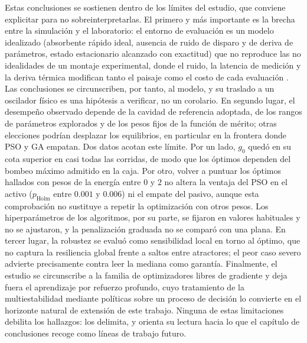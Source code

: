 Estas conclusiones se sostienen dentro de los límites del estudio, que conviene explicitar
para no sobreinterpretarlas. El primero y más importante es la brecha entre la simulación
y el laboratorio: el entorno de evaluación es un modelo idealizado (absorbente rápido
ideal, ausencia de ruido de disparo y de deriva de parámetros, estado estacionario
alcanzado con exactitud) que no reproduce las no idealidades de un montaje experimental,
donde el ruido, la latencia de medición y la deriva térmica modifican tanto el paisaje
como el costo de cada evaluación \cite{Zhao2020,Baumeister2018}. Las conclusiones se
circunscriben, por tanto, al modelo, y su traslado a un oscilador físico es una hipótesis
a verificar, no un corolario. En segundo lugar, el desempeño observado depende de la
cavidad de referencia adoptada, de los rangos de parámetros explorados y de los pesos
fijos de la función de mérito; otras elecciones podrían desplazar los equilibrios, en
particular en la frontera donde PSO y GA empatan.
Dos datos acotan este límite. Por un lado, $g_0$ quedó en su cota superior en casi todas
las corridas, de modo que los óptimos dependen del bombeo máximo admitido en la caja. Por
otro, volver a puntuar los óptimos hallados con pesos de la energía entre $0$ y $2$ no
altera la ventaja del PSO en el activo ($p_{\mathrm{Holm}}$ entre $0.001$ y $0.006$) ni el
empate del pasivo, aunque esta comprobación no sustituye a repetir la optimización con
otros pesos. Los hiperparámetros de los algoritmos, por su parte, se fijaron en valores
habituales y no se ajustaron, y la penalización graduada no se comparó con una plana. En tercer lugar, la robustez se evaluó
como sensibilidad local en torno al óptimo, que no captura la resiliencia global frente a
saltos entre atractores; el peor caso severo advierte precisamente contra leer la mediana
como garantía. Finalmente, el estudio se circunscribe a la familia de optimizadores libres
de gradiente y deja fuera el aprendizaje por refuerzo profundo, cuyo tratamiento de la
multiestabilidad mediante políticas sobre un proceso de decisión \cite{Kokhanovskiy2024}
lo convierte en el horizonte natural de extensión de este trabajo. Ninguna de estas
limitaciones debilita los hallazgos: los delimita, y orienta su lectura hacia lo que el
capítulo de conclusiones recoge como líneas de trabajo futuro.
